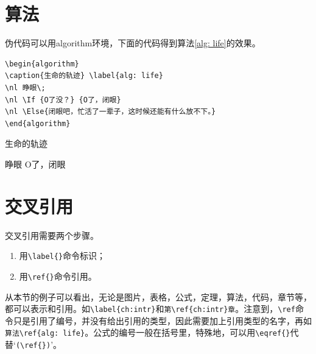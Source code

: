 \section{算法}\label{sect:algNcode}
伪代码可以用algorithm环境，下面的代码得到算法\ref{alg: life}的效果。
\begin{verbatim}
\begin{algorithm}
\caption{生命的轨迹} \label{alg: life}
\nl 睁眼\;
\nl \If {O了没？} {O了，闭眼}
\nl \Else{闭眼吧，忙活了一辈子，这时候还能有什么放不下。}
\end{algorithm}
\end{verbatim}
\begin{algorithm}
\caption{生命的轨迹} \label{alg: life}
\nl 睁眼\;
\nl {} {O了，闭眼}
\nl {}
\end{algorithm}
%
\section{交叉引用}\label{sect:ref}
交叉引用需要两个步骤。
\begin{enumerate}
 \item 用\verb|\label{}|命令标识；
 \item 用\verb|\ref{}|命令引用。
\end{enumerate}

从本节的例子可以看出，无论是图片，表格，公式，定理，算法，代码，章节等，都可以表示和引用。如\verb|\label{ch:intr}|和\verb|第\ref{ch:intr}章|。注意到，\verb|\ref|命令只是引用了编号，并没有给出引用的类型，因此需要加上引用类型的名字，再如\verb|算法\ref{alg: life}|。公式的编号一般在括号里，特殊地，可以用\verb|\eqref{}|代替`\verb|(\ref{})|'。



